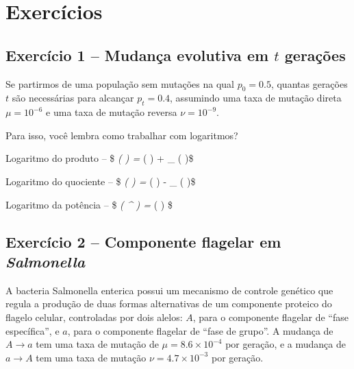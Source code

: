 \documentclass[
]{book}
\begin{document}
\hypertarget{exercuxedcios-6}{%
\section{Exercícios}\label{exercuxedcios-6}}

\hypertarget{exercuxedcio-1-mudanuxe7a-evolutiva-em-t-gerauxe7uxf5es}{%
\subsection{\texorpdfstring{Exercício 1 -- Mudança evolutiva em \(t\) gerações}{Exercício 1 -- Mudança evolutiva em t gerações}}\label{exercuxedcio-1-mudanuxe7a-evolutiva-em-t-gerauxe7uxf5es}}

Se partirmos de uma população sem mutações na qual \(p_0 = 0.5\), quantas gerações \(t\) são necessárias para alcançar \(p_t = 0.4\), assumindo uma taxa de mutação direta \(\mu = 10^{-6}\) e uma taxa de mutação reversa \(\nu = 10^{-9}\).

Para isso, você lembra como trabalhar com logaritmos?

Logaritmo do produto -- \$ \log\emph{\color{red}{a} \left( \color{blue}{b}\cdot \color{green}{c} \right) = \log}\color{red}{a} \left( \color{blue}{b} \right) + \log\_\color{red}{a} \left( \color{green}{c} \right)\$

Logaritmo do quociente -- \$ \log\emph{\color{red}{a} \left( \frac {\color{blue}{b}}{\color{green}{c}} \right) = \log}\color{red}{a} \left( \color{blue}{b} \right) - \log\_\color{red}{a} \left( \color{green}{c} \right)\$

Logaritmo da potência -- \$ \log\emph{\color{red}{a} \left( \color{blue}{b}\^{}\color{green}{c} \right) = \color{green}{c} \cdot \log}\color{red}{a} \left( \color{blue}{b} \right) \$

\hypertarget{exercuxedcio-2-componente-flagelar-em-salmonella}{%
\subsection{\texorpdfstring{Exercício 2 -- Componente flagelar em \emph{Salmonella}}{Exercício 2 -- Componente flagelar em Salmonella}}\label{exercuxedcio-2-componente-flagelar-em-salmonella}}

A bacteria Salmonella enterica possui um mecanismo de controle genético que regula a produção de duas formas alternativas de um componente proteico do flagelo celular, controladas por dois alelos: \(A\), para o componente flagelar de ``fase específica'', e \(a\), para o componente flagelar de ``fase de grupo''. A mudança de \(A \to a\) tem uma taxa de mutação de \(\mu = 8.6 \times 10^{-4}\) por geração, e a mudança de \(a \to A\) tem uma taxa de mutação \(\nu = 4.7 \times 10^{-3}\) por geração.
\end{document}
